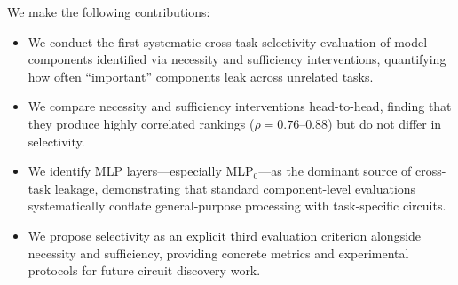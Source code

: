 We make the following contributions:
\begin{itemize}[leftmargin=*,itemsep=0pt,topsep=0pt]
    \item We conduct the first systematic cross-task selectivity evaluation of model components identified via necessity and sufficiency interventions, quantifying how often ``important'' components leak across unrelated tasks.
    \item We compare necessity and sufficiency interventions head-to-head, finding that they produce highly correlated rankings ($\rho = 0.76$--$0.88$) but do not differ in selectivity.
    \item We identify MLP layers---especially MLP$_0$---as the dominant source of cross-task leakage, demonstrating that standard component-level evaluations systematically conflate general-purpose processing with task-specific circuits.
    \item We propose selectivity as an explicit third evaluation criterion alongside necessity and sufficiency, providing concrete metrics and experimental protocols for future circuit discovery work.
\end{itemize}